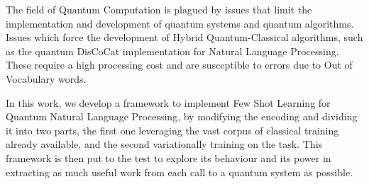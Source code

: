 
The field of Quantum Computation is plagued by issues that limit the implementation and development of quantum systems and quantum algorithms. Issues which force the development of Hybrid Quantum-Classical algorithms, such as the quantum DisCoCat implementation for Natural Language Processing. These require a high processing cost and are susceptible to errors due to Out of Vocabulary words. 

In this work, we develop a framework to implement Few Shot Learning for Quantum Natural Language Processing, by modifying the encoding \mya and dividing it into two parts, the first one leveraging the vast corpus of classical training already available, and the second variationally training on the task. This framework is then put to the test to explore its behaviour and its power in extracting as much useful work from each call to a quantum system as possible.
